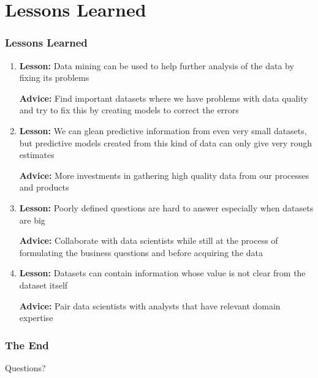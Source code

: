 \documentclass[10pt]{beamer}
\begin{document}
\section{Lessons Learned}

\begin{frame}
\frametitle{Lessons Learned}

\begin{enumerate}
    \item

        \textbf{Lesson:} Data mining can be used to help further analysis of the data by fixing its problems

    \pause
        \textbf{Advice:} Find important datasets where we have problems with data quality and try to fix this
        by creating models to correct the errors
        
    \item

    \pause
        \textbf{Lesson:} We can glean predictive information from even very small datasets, but predictive models
        created from this kind of data can only give very rough estimates

    \pause
        \textbf{Advice:} More investments in gathering high quality data from our processes and products

    \pause
    \item

    \pause
        \textbf{Lesson:} Poorly defined questions are hard to answer especially when datasets are big

    \pause
        \textbf{Advice:} Collaborate with data scientists while still at the process of formulating
        the business questions and before acquiring the data

    \pause
    \item

    \pause
        \textbf{Lesson:} Datasets can contain information whose value is not clear from the dataset itself

    \pause
        \textbf{Advice:} Pair data scientists with analysts that have relevant domain expertise

\end{enumerate}

\end{frame}

\begin{frame}
\frametitle{The End}

\Huge{\centerline{Questions?}}

\end{frame}

\end{document}
